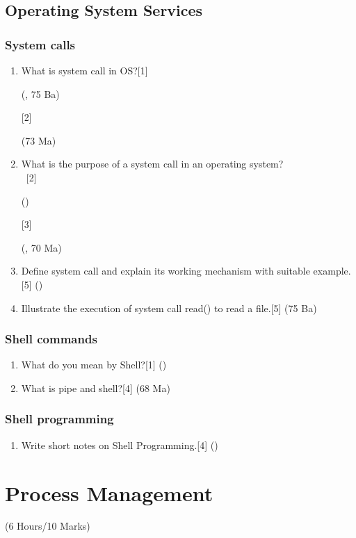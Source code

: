 \documentclass[12pt]{article}
\newcommand{\enter}{\\\textcolor{white}{1}}
\begin{document}
	\subsection{Operating System Services}
	\subsubsection{System calls}
	\begin{enumerate}
	\item What is system call in OS?\hfill[1] \begin{small}(, 75 Ba)\end{small} [2] \begin{small}(73 Ma)\end{small}
	\item What is the purpose of a system call in an operating system?
	\enter\hfill[2] \begin{small}()\end{small} [3] \begin{small}(, 70 Ma)\end{small}
	\item Define system call and explain its working mechanism with suitable example.\hfill[5] ()
	\item Illustrate the execution of system call read() to read a file.\hfill[5] (75 Ba)
	\end{enumerate}
	\subsubsection{Shell commands}
	\begin{enumerate}
	\item What do you mean by Shell?\hfill[1] ()
	\item What is pipe and shell?\hfill[4] (68 Ma)
	\end{enumerate}
	\subsubsection{Shell programming}
	\begin{enumerate}
	\item Write short notes on Shell Programming.\hfill[4] ()
	\end{enumerate}

	\pagebreak
\section{Process Management}
	\begin{center}(6 Hours/10 Marks)\end{center}
\end{document}
